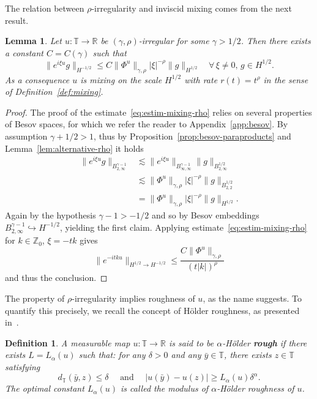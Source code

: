 \documentclass[11pt,oneside,reqno]{amsart}
\newcommand{\tmdfn}[1]{\textbf{#1}}
\newtheorem{definition}[theorem]{Definition}
\newtheorem{lemma}[theorem]{Lemma}
\numberwithin{equation}{section}
\begin{document}
The relation between $\rho$-irregularity and inviscid mixing comes from the
next result.

\begin{lemma}
  \label{lem:estim-mixing-rho}Let $u : \mathbb{T} \rightarrow \mathbb{R}$ be
  $(\gamma, \rho)$-irregular for some $\gamma > 1 / 2$. Then there exists a
  constant $C = C (\gamma)$ such that
  \begin{equation}
    \| e^{i \xi u} g \|_{H^{- 1 / 2}} \leqslant C \| \Phi^u \|_{\gamma, \rho} 
    | \xi |^{- \rho} \| g \|_{H^{1 / 2}}  \quad \forall \, \xi \neq 0, \, g
    \in H^{1 / 2} . \label{eq:estim-mixing-rho}
  \end{equation}
  As a consequence $u$ is mixing on the scale $H^{1 / 2}$ with rate $r (t) =
  t^{\rho}$ in the sense of Definition~\ref{def:mixing}.
\end{lemma}

\begin{proof}
  The proof of the estimate~\eqref{eq:estim-mixing-rho} relies on several
  properties of Besov spaces, for which we refer the reader to
  Appendix~\ref{app:besov}. By assumption $\gamma + 1 / 2 > 1$, thus by
  Proposition~\ref{prop:besov-paraproducts} and
  Lemma~\ref{lem:alternative-rho} it holds
%  
  \begin{align*}
    \| e^{i \xi u} g \|_{B^{\gamma - 1}_{2, \infty}} & \lesssim \| e^{i \xi u}
    \|_{B^{\gamma - 1}_{\infty, \infty}} \| g \|_{B^{1 / 2}_{2, \infty}}\\
    & \lesssim \| \Phi^u \|_{\gamma, \rho}  | \xi |^{- \rho} \| g \|_{B^{1 /
    2}_{2, 2}}\\
    & = \| \Phi^u \|_{\gamma, \rho}  | \xi |^{- \rho} \| g \|_{H^{1 / 2}} .
  \end{align*}
%  
  Again by the hypothesis $\gamma - 1 > - 1 / 2$ and so by Besov embeddings
  $B^{\gamma - 1}_{2, \infty} \hookrightarrow H^{- 1 / 2}$, yielding the first
  claim. Applying estimate~\eqref{eq:estim-mixing-rho} for $k \in
  \mathbb{Z}_0$, $\xi = - t k$ gives
  \[ \| e^{- i t k u} \|_{H^{1 / 2} \rightarrow H^{- 1 / 2}} \leqslant \frac{C
     \| \Phi^u \|_{\gamma, \rho} }{(t | k |)^{\rho}} \]
  and thus the conclusion.
\end{proof}

The property of $\rho$-irregularity implies roughness of $u$, as the name
suggests. To quantify this precisely, we recall the concept of H\"{o}lder
roughness, as presented in~{\cite{frizhairer}}.

\begin{definition}
  \label{def:holder-roughness}A measurable map $u : \mathbb{T} \rightarrow
  \mathbb{R}$ is said to be $\alpha$-H\"{o}lder {\tmdfn{rough}} if there
  exists $L = L_{\alpha} (u)$ such that: for any $\delta > 0$ and any $\bar{y}
  \in \mathbb{T}$, there exists $z \in \mathbb{T}$ satisfying
  \[ d_{\mathbb{T}} (\bar{y}, z) \leqslant \delta \quad \text{ and } \quad | u
     (\bar{y}) - u (z) | \geqslant L_{\alpha} (u) \delta^{\alpha} . \]
  The optimal constant $L_{\alpha} (u)$ is called the modulus of
  $\alpha$-H\"{o}lder roughness of $u$.
\end{definition}
\end{document}
